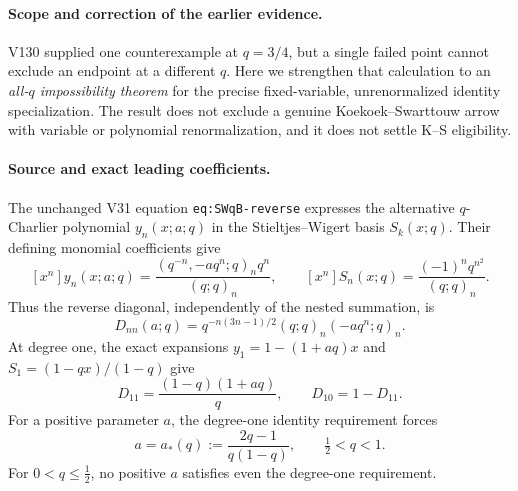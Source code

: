 \documentclass[11pt]{article}
\begin{document}
\paragraph{Scope and correction of the earlier evidence.}
V130 supplied one counterexample at $q=3/4$, but a single failed point cannot exclude an endpoint at a different $q$. Here we strengthen that calculation to an \emph{all-$q$ impossibility theorem} for the precise fixed-variable, unrenormalized identity specialization. The result does not exclude a genuine Koekoek--Swarttouw arrow with variable or polynomial renormalization, and it does not settle K--S eligibility.

\paragraph{Source and exact leading coefficients.}
The unchanged V31 equation \texttt{eq:SWqB-reverse} expresses the alternative $q$-Charlier polynomial $y_n(x;a;q)$ in the Stieltjes--Wigert basis $S_k(x;q)$. Their defining monomial coefficients give
\[
 [x^n]y_n(x;a;q)=\frac{(q^{-n},-aq^n;q)_n q^n}{(q;q)_n},\qquad
 [x^n]S_n(x;q)=\frac{(-1)^nq^{n^2}}{(q;q)_n}.
\]
Thus the reverse diagonal, independently of the nested summation, is
\begin{equation}\label{eq:v131-diagonal}
 D_{nn}(a;q)=q^{-n(3n-1)/2}(q;q)_n(-aq^n;q)_n.
\end{equation}
At degree one, the exact expansions $y_1=1-(1+aq)x$ and $S_1=(1-qx)/(1-q)$ give
\[
 D_{11}=\frac{(1-q)(1+aq)}q,\qquad D_{10}=1-D_{11}.
\]
For a positive parameter $a$, the degree-one identity requirement forces
\begin{equation}\label{eq:v131-a-star}
 a=a_*(q):=\frac{2q-1}{q(1-q)},\qquad \tfrac12<q<1.
\end{equation}
For $0<q\le\tfrac12$, no positive $a$ satisfies even the degree-one requirement.
\end{document}
